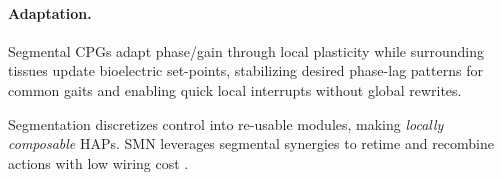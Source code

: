 \paragraph{Adaptation.}
Segmental CPGs adapt phase/gain through local plasticity while surrounding tissues update bioelectric set-points, stabilizing desired phase-lag patterns for common gaits and enabling quick local interrupts without global rewrites.

Segmentation discretizes control into re-usable modules, making \emph{locally composable} HAPs. SMN leverages segmental synergies to retime and recombine actions with low wiring cost \citep{BizziCheung2013}.
